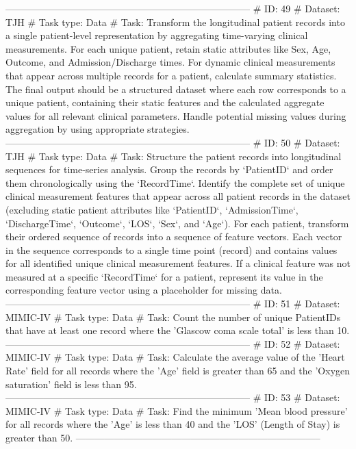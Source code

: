 \begin{tcolorbox}[colback=cadmiumgreen!5!white,colframe=forestgreen!75!white,breakable,title=\textit{Generated analytical tasks in task 4.}]
\begin{VerbatimWrap}
-----------------------------------------------------------------------------
# ID: 49  
# Dataset: TJH 
# Task type: Data
# Task: Transform the longitudinal patient records into a single patient-level representation by aggregating time-varying clinical measurements. For each unique patient, retain static attributes like Sex, Age, Outcome, and Admission/Discharge times. For dynamic clinical measurements that appear across multiple records for a patient, calculate summary statistics. The final output should be a structured dataset where each row corresponds to a unique patient, containing their static features and the calculated aggregate values for all relevant clinical parameters. Handle potential missing values during aggregation by using appropriate strategies. 
-----------------------------------------------------------------------------
# ID: 50  
# Dataset: TJH 
# Task type: Data
# Task: Structure the patient records into longitudinal sequences for time-series analysis. Group the records by `PatientID` and order them chronologically using the `RecordTime`. Identify the complete set of unique clinical measurement features that appear across all patient records in the dataset (excluding static patient attributes like `PatientID`, `AdmissionTime`, `DischargeTime`, `Outcome`, `LOS`, `Sex`, and `Age`). For each patient, transform their ordered sequence of records into a sequence of feature vectors. Each vector in the sequence corresponds to a single time point (record) and contains values for all identified unique clinical measurement features. If a clinical feature was not measured at a specific `RecordTime` for a patient, represent its value in the corresponding feature vector using a placeholder for missing data. 
-----------------------------------------------------------------------------
# ID: 51  
# Dataset: MIMIC-IV 
# Task type: Data
# Task: Count the number of unique PatientIDs that have at least one record where the 'Glascow coma scale total' is less than 10.
-----------------------------------------------------------------------------
# ID: 52  
# Dataset: MIMIC-IV 
# Task type: Data
# Task: Calculate the average value of the 'Heart Rate' field for all records where the 'Age' field is greater than 65 and the 'Oxygen saturation' field is less than 95.
-----------------------------------------------------------------------------
# ID: 53  
# Dataset: MIMIC-IV 
# Task type: Data
# Task: Find the minimum 'Mean blood pressure' for all records where the 'Age' is less than 40 and the 'LOS' (Length of Stay) is greater than 50.
-----------------------------------------------------------------------------

\end{VerbatimWrap}
\end{tcolorbox}
